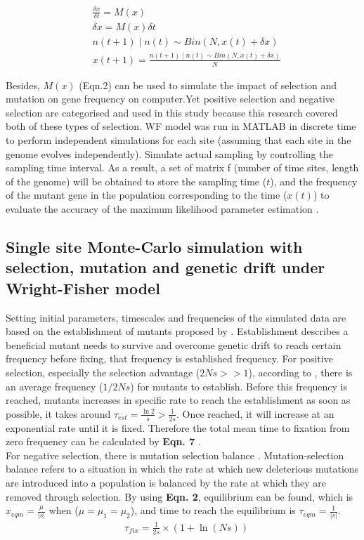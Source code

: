 \documentclass[12pt]{article}
\begin{document}
\begin{align}
  &  \frac{\delta x} {\delta t} = M(x)\\
  &  \delta x = M(x) \delta t\\
  &  n(t+1)∣n(t)∼Bin(N,x(t)+ \delta x) \\
  &  x(t+1) = \frac{n(t+1)∣n(t)∼Bin(N,x(t)+ \delta x)} {N}
\end{align}


Besides, $M(x)$ (Eqn.2) can be used to simulate the impact of selection and mutation on gene frequency on computer.Yet positive selection and negative selection are categorised and used in this study because this research covered both of these types of selection. WF model was run in MATLAB in discrete time to perform independent simulations for each site (assuming that each site in the genome evolves independently). Simulate actual sampling by controlling the sampling time interval. As a result, a set of matrix f (number of time sites, length of the genome) will be obtained to store the sampling time ($t$), and the frequency of the mutant gene in the population corresponding to the time ($x(t)$) to evaluate the accuracy of the maximum likelihood parameter estimation .\\
\subsection{Single site Monte-Carlo simulation with selection, mutation and genetic drift under Wright-Fisher model} 

Setting initial parameters, timescales and frequencies of the simulated data are based on the establishment of mutants proposed by \cite{desai2007beneficial}. Establishment describes a beneficial mutant needs to survive and overcome genetic drift to reach certain frequency before fixing, that frequency is established frequency. For positive selection, especially the selection advantage ($2Ns>>1$), according to \cite{desai2007beneficial}, there is an average frequency ($1/2Ns$) for mutants to establish. Before this frequency is reached, mutants increases in specific rate to reach the establishment as soon as possible, it takes around $\tau_{est}= \frac{\ln 2}{s} >\frac{1}{2s}$. Once reached, it will increase at an exponential rate until it is fixed. Therefore the total mean time to fixation from zero frequency can be calculated by \textbf{Eqn. 7} \citep{desai2007beneficial}. \\

For negative selection, there is mutation selection balance \citep{crow1970introduction}. Mutation-selection balance refers to a situation in which the rate at which new deleterious mutations are introduced into a population is balanced by the rate at which they are removed through selection. By using \textbf{Eqn. 2}, equilibrium can be found, which is $x_{eqm}=\frac{\mu}{|s|}$ when ($\mu=\mu_1=\mu_2$), and time to reach the equilibrium is $\tau_{eqm} =\frac{1}{|s|}$.\\
\begin{align}
  &  \tau_{fix} =\frac{1}{2s}\times(1+\ln(Ns))
\end{align}
\end{document}
